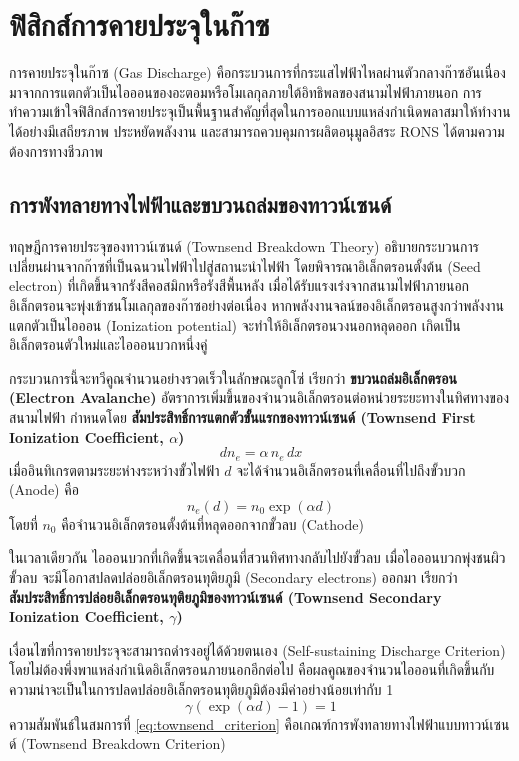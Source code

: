\section{ฟิสิกส์การคายประจุในก๊าซ}

การคายประจุในก๊าซ (Gas Discharge) คือกระบวนการที่กระแสไฟฟ้าไหลผ่านตัวกลางก๊าซอันเนื่องมาจากการแตกตัวเป็นไอออนของอะตอมหรือโมเลกุลภายใต้อิทธิพลของสนามไฟฟ้าภายนอก การทำความเข้าใจฟิสิกส์การคายประจุเป็นพื้นฐานสำคัญที่สุดในการออกแบบแหล่งกำเนิดพลาสมาให้ทำงานได้อย่างมีเสถียรภาพ ประหยัดพลังงาน และสามารถควบคุมการผลิตอนุมูลอิสระ RONS ได้ตามความต้องการทางชีวภาพ

\subsection{การพังทลายทางไฟฟ้าและขบวนถล่มของทาวน์เซนด์}

ทฤษฎีการคายประจุของทาวน์เซนด์ (Townsend Breakdown Theory) อธิบายกระบวนการเปลี่ยนผ่านจากก๊าซที่เป็นฉนวนไฟฟ้าไปสู่สถานะนำไฟฟ้า โดยพิจารณาอิเล็กตรอนตั้งต้น (Seed electron) ที่เกิดขึ้นจากรังสีคอสมิกหรือรังสีพื้นหลัง เมื่อได้รับแรงเร่งจากสนามไฟฟ้าภายนอก อิเล็กตรอนจะพุ่งเข้าชนโมเลกุลของก๊าซอย่างต่อเนื่อง หากพลังงานจลน์ของอิเล็กตรอนสูงกว่าพลังงานแตกตัวเป็นไอออน (Ionization potential) จะทำให้อิเล็กตรอนวงนอกหลุดออก เกิดเป็นอิเล็กตรอนตัวใหม่และไอออนบวกหนึ่งคู่

กระบวนการนี้จะทวีคูณจำนวนอย่างรวดเร็วในลักษณะลูกโซ่ เรียกว่า \textbf{ขบวนถล่มอิเล็กตรอน (Electron Avalanche)} อัตราการเพิ่มขึ้นของจำนวนอิเล็กตรอนต่อหน่วยระยะทางในทิศทางของสนามไฟฟ้า กำหนดโดย \textbf{สัมประสิทธิ์การแตกตัวขั้นแรกของทาวน์เซนด์ (Townsend First Ionization Coefficient, $\alpha$)}
\begin{equation}
    dn_e = \alpha \, n_e \, dx
\end{equation}
เมื่ออินทิเกรตตามระยะห่างระหว่างขั้วไฟฟ้า $d$ จะได้จำนวนอิเล็กตรอนที่เคลื่อนที่ไปถึงขั้วบวก (Anode) คือ
\begin{equation}
    n_e(d) = n_0 \exp(\alpha d)
\end{equation}
โดยที่ $n_0$ คือจำนวนอิเล็กตรอนตั้งต้นที่หลุดออกจากขั้วลบ (Cathode)

ในเวลาเดียวกัน ไอออนบวกที่เกิดขึ้นจะเคลื่อนที่สวนทิศทางกลับไปยังขั้วลบ เมื่อไอออนบวกพุ่งชนผิวขั้วลบ จะมีโอกาสปลดปล่อยอิเล็กตรอนทุติยภูมิ (Secondary electrons) ออกมา เรียกว่า \textbf{สัมประสิทธิ์การปล่อยอิเล็กตรอนทุติยภูมิของทาวน์เซนด์ (Townsend Secondary Ionization Coefficient, $\gamma$)} 

เงื่อนไขที่การคายประจุจะสามารถดำรงอยู่ได้ด้วยตนเอง (Self-sustaining Discharge Criterion) โดยไม่ต้องพึ่งพาแหล่งกำเนิดอิเล็กตรอนภายนอกอีกต่อไป คือผลคูณของจำนวนไอออนที่เกิดขึ้นกับความน่าจะเป็นในการปลดปล่อยอิเล็กตรอนทุติยภูมิต้องมีค่าอย่างน้อยเท่ากับ 1
\begin{equation}
    \gamma \left( \exp(\alpha d) - 1 \right) = 1
    \label{eq:townsend_criterion}
\end{equation}
ความสัมพันธ์ในสมการที่ \eqref{eq:townsend_criterion} คือเกณฑ์การพังทลายทางไฟฟ้าแบบทาวน์เซนด์ (Townsend Breakdown Criterion)

